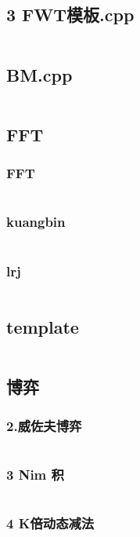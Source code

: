 \documentclass{article}
\begin{document}
\subsection{3 FWT模板.cpp}
\inputminted{c++}{/home/zzuzxy/t3/ACM-template/4 数学/3 FWT模板.cpp}
\subsection{BM.cpp}
\inputminted{c++}{/home/zzuzxy/t3/ACM-template/4 数学/BM.cpp}
\subsection{FFT}
\subsubsection{FFT}
\inputminted{c++}{/home/zzuzxy/t3/ACM-template/4 数学/FFT/FFT.cpp}
\subsubsection{kuangbin}
\inputminted{c++}{/home/zzuzxy/t3/ACM-template/4 数学/FFT/kuangbin.cpp}
\subsubsection{lrj}
\inputminted{c++}{/home/zzuzxy/t3/ACM-template/4 数学/FFT/lrj.cpp}
\subsection{template}
\inputminted{c++}{/home/zzuzxy/t3/ACM-template/4 数学/Lagrange-poly/template.cpp}
\subsection{博弈}
\subsubsection{2.威佐夫博弈}
\inputminted{c++}{/home/zzuzxy/t3/ACM-template/4 数学/博弈/2.威佐夫博弈.cpp}
\subsubsection{3 Nim 积}
\inputminted{c++}{/home/zzuzxy/t3/ACM-template/4 数学/博弈/3 Nim 积.cpp}
\subsubsection{4 K倍动态减法}
\inputminted{c++}{/home/zzuzxy/t3/ACM-template/4 数学/博弈/4 K倍动态减法.cpp}
\end{document}
